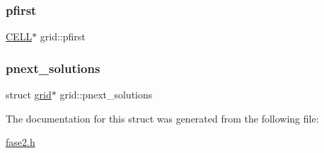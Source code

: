 \subsubsection{\texorpdfstring{pfirst}{pfirst}}
{\footnotesize\ttfamily \mbox{\hyperlink{fase2_8h_ad8a16a9022d96f964fca68b495a55125}{C\+E\+LL}}$\ast$ grid\+::pfirst}

\mbox{\label{structgrid_a540ceb7b55232237335a503ab262413f}} 
\subsubsection{\texorpdfstring{pnext\_solutions}{pnext\_solutions}}
{\footnotesize\ttfamily struct \mbox{\hyperlink{structgrid}{grid}}$\ast$ grid\+::pnext\+\_\+solutions}



The documentation for this struct was generated from the following file\+:\begin{DoxyCompactItemize}
\item 
\mbox{\hyperlink{fase2_8h}{fase2.\+h}}\end{DoxyCompactItemize}
